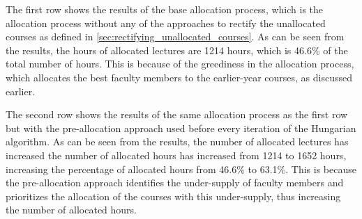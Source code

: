 \begin{table}[H]
  \centering
  \caption{Experimental Results}
  \label{tab:overall_experimental_results}
\end{table}

The first row shows the results of the base allocation process, which is the allocation process without any of the approaches to rectify the unallocated courses as defined in  \autoref{sec:rectifying_unallocated_courses}. As can be seen from the results, the hours of allocated lectures are 1214 hours, which is 46.6\% of the total number of hours. This is because of the greediness in the allocation process, which allocates the best faculty members to the earlier-year courses, as discussed earlier.

The second row shows the results of the same allocation process as the first row but with the pre-allocation approach used before every iteration of the Hungarian algorithm. As can be seen from the results, the number of allocated lectures has increased the number of allocated hours has increased from 1214 to 1652 hours, increasing the percentage of allocated hours from 46.6\% to 63.1\%. This is because the pre-allocation approach identifies the under-supply of faculty members and prioritizes the allocation of the courses with this under-supply, thus increasing the number of allocated hours.

